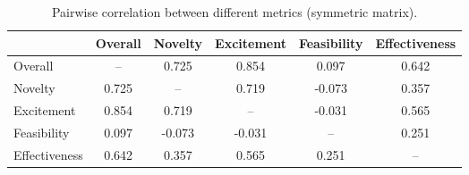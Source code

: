 \begin{table}[t]
\centering
\small
\begin{tabular}{l c c c c c} 
 \hline
 & Overall & Novelty & Excitement & Feasibility & Effectiveness \\ 
 \hline
 Overall & -- & 0.725 & 0.854 & 0.097 & 0.642 \\ 
 Novelty & 0.725 & -- & 0.719 & -0.073 & 0.357 \\ 
 Excitement & 0.854 & 0.719 & -- & -0.031 & 0.565 \\ 
 Feasibility & 0.097 & -0.073 & -0.031 & -- & 0.251 \\ 
 Effectiveness & 0.642 & 0.357 & 0.565 & 0.251 & -- \\ 
 \hline
\end{tabular}
\caption{Pairwise correlation between different metrics (symmetric matrix).}
\label{table:metric_correlation}
\end{table}







